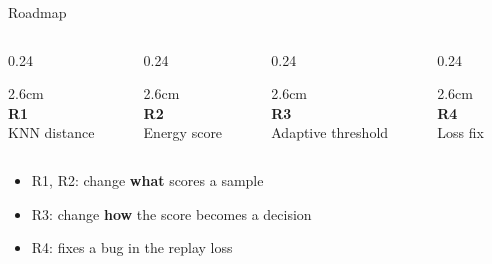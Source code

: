 \documentclass[aspectratio=169,10pt]{beamer}
\begin{document}
\begin{frame}{Roadmap}
  \begin{columns}[T]
    \begin{column}{0.24\textwidth}\begin{cardh}{2.6cm}\centering{}\\[1mm]{\rmfamily\bfseries\color{Navy}R1}\\{\footnotesize KNN distance}\end{cardh}\end{column}
    \begin{column}{0.24\textwidth}\begin{cardh}{2.6cm}\centering{}\\[1mm]{\rmfamily\bfseries\color{Navy}R2}\\{\footnotesize Energy score}\end{cardh}\end{column}
    \begin{column}{0.24\textwidth}\begin{cardh}{2.6cm}\centering{}\\[1mm]{\rmfamily\bfseries\color{Navy}R3}\\{\footnotesize Adaptive threshold}\end{cardh}\end{column}
    \begin{column}{0.24\textwidth}\begin{cardh}{2.6cm}\centering{}\\[1mm]{\rmfamily\bfseries\color{Navy}R4}\\{\footnotesize Loss fix}\end{cardh}\end{column}
  \end{columns}
  \vspace{6mm}
  \begin{itemize}
    \setlength\itemsep{3mm}
    \item R1, R2: change \textbf{what} scores a sample
    \item R3: change \textbf{how} the score becomes a decision
    \item R4: fixes a bug in the replay loss
  \end{itemize}
\end{frame}
\end{document}
